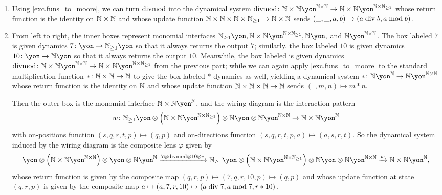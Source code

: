 \documentclass[Book-Poly]{subfiles}
\begin{document}
\begin{exercise}
\begin{enumerate}
\qedhere
\end{enumerate}
\begin{solution}
\begin{enumerate}
    \item Using \cref{exc.funs_to_moore}, we can turn $\mathrm{divmod}$ into the dynamical system $\fun{divmod}\colon\nn\times\nn\yon^{\nn\times\nn}\to\nn\times\nn\yon^{\nn\times\nn_{\geq1}}$ whose return function is the identity on $\mathbb{N}\times\mathbb{N}$ and whose update function $\mathbb{N}\times\mathbb{N}\times\mathbb{N}\times\mathbb{N}_{\geq1}\to\mathbb{N}\times\mathbb{N}$ sends $(\_,\_,a,b)\mapsto(a\bdiv b,a\bmod b)$.
    \item From left to right, the inner boxes represent monomial interfaces $\nn_{\geq1}\yon, \nn\times\nn\yon^{\nn\times\nn_{\geq1}}, \nn\yon,$ and $\nn\yon^{\nn\times\nn}$.
    The box labeled $7$ is given dynamics $7\colon\yon\to\nn_{\geq1}\yon$ so that it always returns the output $7$; similarly, the box labeled $10$ is given dynamics $10\colon\yon\to\nn\yon$ so that it always returns the output $10$.
    Meanwhile, the box labeled is given dynamics $\fun{divmod}\colon\nn\times\nn\yon^{\nn\times\nn}\to\nn\times\nn\yon^{\nn\times\nn_{\geq1}}$ from the previous part; while we can again apply \cref{exc.funs_to_moore} to the standard multiplication function $*\colon\mathbb{N}\times\mathbb{N}\to\mathbb{N}$ to give the box labeled $*$ dynamics as well, yielding a dynamical system $*\colon\nn\yon^\nn\to\nn\yon^{\nn\times\nn}$ whose return function is the identity on $\mathbb{N}$ and whose update function $\mathbb{N}\times\mathbb{N}\times\mathbb{N}\to\mathbb{N}$ sends $(\_,m,n)\mapsto m*n$.

    Then the outer box is the monomial interface $\nn\times\nn\yon^\nn$, and the wiring diagram is the interaction pattern
    \[
        w\colon\nn_{\geq1}\yon\otimes\left(\nn\times\nn\yon^{\nn\times\nn_{\geq1}}\right)\otimes\nn\yon\otimes\nn\yon^{\nn\times\nn}\to\nn\times\nn\yon^\nn
    \]
    with on-positions function $(s,q,r,t,p)\mapsto(q,p)$ and on-directions function $(s,q,r,t,p,a)\mapsto(a,s,r,t)$.
    So the dynamical system induced by the wiring diagram is the composite lens $\varphi$ given by
    \[
        \yon\otimes\left(\nn\times\nn\yon^{\nn\times\nn}\right)\otimes\yon\otimes\nn\yon^\nn\To{7\otimes\fun{divmod}\otimes10\otimes*}\nn_{\geq1}\yon\otimes\left(\nn\times\nn\yon^{\nn\times\nn_{\geq1}}\right)\otimes\nn\yon\otimes\nn\yon^{\nn\times\nn}\To{w}\nn\times\nn\yon^\nn,
    \]
    whose return function is given by the composite map $(q,r,p)\mapsto(7,q,r,10,p)\mapsto(q,p)$ and whose update function at state $(q,r,p)$ is given by the composite map $a\mapsto(a,7,r,10)\mapsto(a\bdiv7,a\bmod7,r*10)$.


\end{enumerate}
\end{solution}
\end{exercise}
\end{document}
